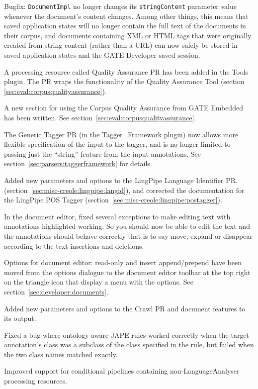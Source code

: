 Bugfix: {\tt DocumentImpl} no longer changes its {\tt stringContent} parameter
value whenever the document's content changes.  Among other things, this means
that saved application states will no longer contain the full text of the
documents in their corpus, and documents containing XML or HTML tags that were
originally created from string content (rather than a URL) can now safely be
stored in saved application states and the GATE Developer saved session.

A processing resource called Quality Assurance PR has been added in the Tools
plugin. The PR wraps the functionality of the Quality Assurance Tool 
(section \ref{sec:eval:corpusqualityassurance}).

A new section for using the Corpus Quality Assurance from GATE Embedded has
been written. See section~\ref{sec:eval:corpusqualityassurance}.

The Generic Tagger PR (in the Tagger\_Framework plugin) now allows more
flexible specification of the input to the tagger, and is no longer limited to
passing just the ``string'' feature from the input annotations.  See
section~\ref{sec:parsers:taggerframework} for details.

Added new parameters and options to the LingPipe Language Identifier PR.
(section~\ref{sec:misc-creole:lingpipe:langid}), and corrected the
documentation for the LingPipe POS Tagger
(section~\ref{sec:misc-creole:lingpipe:postagger}).

In the document editor, fixed several exceptions to make editing text with
annotations highlighted working. So you should now be able to edit the text
and the annotations should behave correctly that is to say move, expand or
disappear according to the text insertions and deletions.

Options for document editor: read-only and insert append/prepend have been
moved from the options dialogue to the document editor toolbar at the top
right on the triangle icon that display a menu with the options. See
section~\ref{sec:developer:documents}.

Added new parameters and options to the Crawl PR and document features to its
output.

Fixed a bug where ontology-aware JAPE rules worked correctly when the target
annotation's class was a subclass of the class specified in the rule, but
failed when the two class names matched exactly.

Improved support for conditional pipelines containing non-LanguageAnalyser
processing resources.

